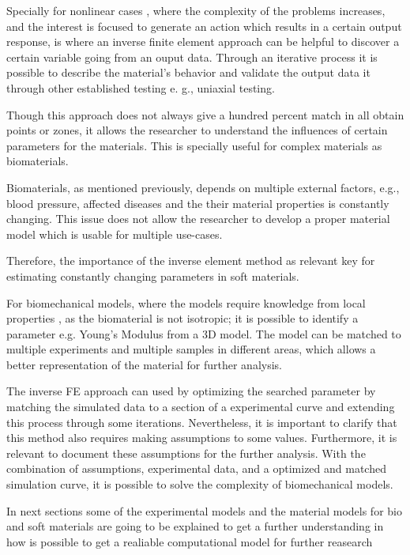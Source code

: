 Specially for nonlinear cases \cite{Husain2004}, where the complexity of the problems 
increases, and the interest is focused to generate an action which results in a 
certain output response, is where an inverse finite element approach can be helpful 
to discover a certain variable going from an ouput data. Through an iterative process it is 
possible to describe the material's behavior and validate the output data it 
through other established testing e. g., uniaxial testing.

Though this approach does not always give a hundred percent match in all obtain points 
or zones, it allows the researcher to understand the influences of certain parameters 
for the materials. This is specially useful for complex materials as biomaterials. 

Biomaterials, as mentioned previously, depends on multiple external factors, e.g., blood 
pressure, affected diseases and the their material properties is constantly changing. 
This issue does not allow the researcher to develop a proper material model which is 
usable for multiple use-cases. 

Therefore, the importance of the inverse element method as relevant key for estimating 
constantly changing parameters in soft materials.

For biomechanical models, where the models require knowledge from local properties \cite{Chai2013},
as the biomaterial is not isotropic; it is possible to identify a parameter e.g. Young's Modulus 
from a 3D model. The model can be matched to multiple experiments and multiple samples in different areas,
which allows a better representation of the material for further analysis.

The inverse FE approach can used by optimizing the searched parameter by matching the simulated data
to a section of a experimental curve and extending this process through some iterations. 
Nevertheless, it is important to clarify that this method also requires making assumptions to some values.
Furthermore, it is relevant to document these assumptions for the further analysis. 
With the combination of assumptions, experimental data, and a optimized and matched simulation curve, it
is possible to solve the complexity of biomechanical models.
 
In next sections some of the experimental models and the material models for bio and soft materials are 
going to be explained to get a further understanding in how is possible to get a realiable computational 
model for further reasearch

